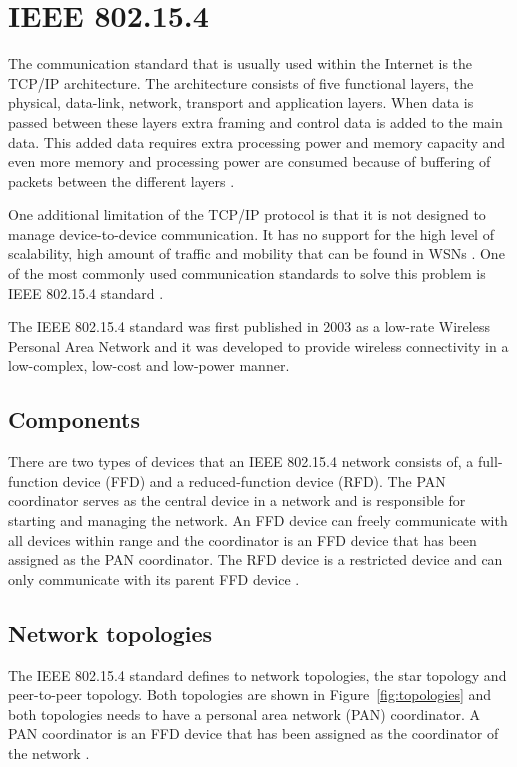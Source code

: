 \section{IEEE 802.15.4}
The communication standard that is usually used within the Internet is the TCP/IP architecture. The architecture consists of five functional layers, the physical, data-link, network, transport and application layers. When data is passed between these layers extra framing and control data is added to the main data. This added data requires extra processing power and memory capacity and even more memory and processing power are consumed because of buffering of packets between the different layers \citep{BELLO201752}.

One additional limitation of the TCP/IP protocol is that it is not designed to manage device-to-device communication. It has no support for the high level of scalability, high amount of traffic and mobility that can be found in WSNs \citep{BELLO201752}. One of the most commonly used communication standards to solve this problem is IEEE 802.15.4 standard \citep{yang2014internet}.

The IEEE 802.15.4 standard was first published in 2003 as a low-rate Wireless Personal Area Network and it was developed to provide wireless connectivity in a low-complex, low-cost and low-power manner. 

\subsection{Components}
There are two types of devices that an IEEE 802.15.4 network consists of, a full-function device (FFD) and a reduced-function device (RFD).  The PAN coordinator serves as the central device in a network and is responsible for starting and managing the network. An FFD device can freely communicate with all devices within range and the coordinator is an FFD device that has been assigned as the PAN coordinator. The RFD device is a restricted device and can only communicate with its parent FFD device \citep{yang2014internet}.

\subsection{Network topologies}
The IEEE 802.15.4 standard defines to network topologies, the star topology and peer-to-peer topology. Both topologies are shown in Figure~\ref{fig:topologies} and both topologies needs to have a personal area network (PAN) coordinator. A PAN coordinator is an FFD device that has been assigned as the coordinator of the network \citep{kohvakka2006performance}.

